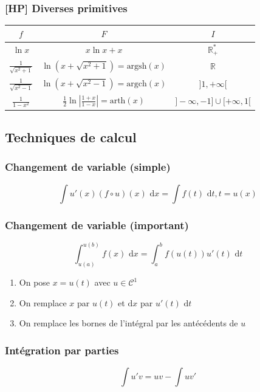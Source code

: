 \documentclass[openany]{book}
\begin{document}
\subsubsection{[HP] Diverses primitives}
\begin{center}
    \renewcommand{\arraystretch}{1.5}
    \begin{tabular}{|c|c|c|}
        \hline
        $f$ & $F$ & $I$ \\
        \hline
        $\ln x$ & $x \ln x + x$ & $\mathbb{R}^*_+$ \\
        \hline
        $\frac{1}{\sqrt{x^2+1}}$ & $\ln(x+\sqrt{x^2+1}) = \text{argsh}(x)$ & $\mathbb{R}$ \\
        \hline
        $\frac{1}{\sqrt{x^2-1}}$ & $\ln(x+\sqrt{x^2-1}) = \text{argch}(x)$ & $]1, +\infty[$ \\
        \hline
        $\frac{1}{1-x^2}$ & $\frac{1}{2}\ln|\frac{1+x}{1-x}| = \text{arth}(x)$ & $]-\infty, -1] \cup [+\infty, 1[$ \\
        \hline
    \end{tabular}
\end{center}

\subsection{Techniques de calcul}

\subsubsection{Changement de variable (simple)}
\[ \int u'(x) (f \circ u)(x) \text{ d}x = \int f(t) \text{ d}t, t = u(x) \]

\subsubsection{Changement de variable (important)}
\[ \int_{u(a)}^{u(b)} f(x) \text{ d}x = \int_{a}^{b} f(u(t)) u'(t) \text{ d}t \]

\begin{enumerate}
    \item On pose $x = u(t)$ avec $u \in \mathcal{C}^1$
    \item On remplace $x$ par $u(t)$ et $\text{d}x$ par $u'(t) \text{ d}t$
    \item On remplace les bornes de l'intégral par les antécédents de $u$
\end{enumerate}

\subsubsection{Intégration par parties}
\[ \int u'v = uv - \int uv' \]
\end{document}
